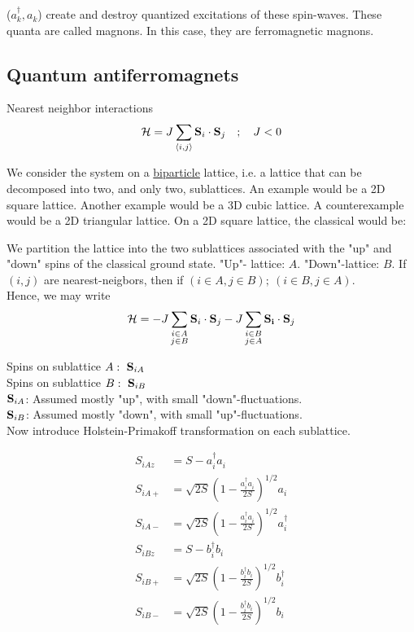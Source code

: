 
($a_k^\dagger, a_k^{}$) create and destroy quantized excitations of these spin-waves. These quanta are called magnons. In this case, they are ferromagnetic magnons.

\subsection{Quantum antiferromagnets}

Nearest neighbor interactions
\begin{equation}
    \mathcal{H} = J \sum_{\langle i, j \rangle}\vb{S}_i\cdot\vb{S}_j \quad ; \quad J < 0
\end{equation}

We consider the system on a \uline{biparticle} lattice, i.e. a lattice that can be decomposed into two, and only two, sublattices. An example would be a 2D square lattice. Another example would be a 3D cubic lattice. A counterexample would be a 2D triangular lattice. On a 2D square lattice, the classical would be:\\


We partition the lattice into the two sublattices associated with the "up" and "down" spins of the classical ground state. "Up"- lattice: $A$. "Down"-lattice: $B$. If $(i, j)$ are nearest-neigbors, then if $(i \in A, j \in B); \ (i \in B, j \in A)$. \\
 Hence, we may write
\begin{equation}
    \mathcal{H} = - J \sum_{\substack{i \in A \\ j \in B}} \vb{S}_i \cdot \vb{S}_j - J \sum_{\substack{i \in B \\ j \in A}} \vb{S_i} \cdot \vb{S}_j
\end{equation}

Spins on sublattice $A: \ \vb{S}_{iA}$ \\
Spins on sublattice $B: \ \vb{S}_{iB}$ \\
$\vb{S}_{iA}$: Assumed mostly "up", with small "down"-fluctuations. \\
$\vb{S}_{iB}$: Assumed mostly "down", with small "up"-fluctuations. \\

Now introduce Holstein-Primakoff transformation on each sublattice.

\begin{align}
    S_{iAz} &= S - a_i^\dagger a_i^{} \\
    S_{iA+} &= \sqrt{2S} (1- \frac{a_i^\dagger a_i^{}}{2S})^{1/2} a_i \\
    S_{iA-} &= \sqrt{2S} (1- \frac{a_i^\dagger a_i^{}}{2S})^{1/2} a_i^\dagger \\
    S_{iBz} &= S - b_i^\dagger b_i^{} \\
    S_{iB+} &= \sqrt{2S} (1- \frac{b_i^\dagger b_i^{}}{2S})^{1/2} b_i^\dagger \\
    S_{iB-} &= \sqrt{2S} (1- \frac{b_i^\dagger b_i^{}}{2S})^{1/2} b_i \\
\end{align}

